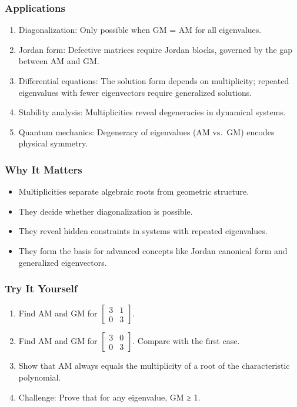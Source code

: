 \documentclass[
  letterpaper,
  DIV=11,
  numbers=noendperiod]{scrreprt}
\providecommand{\tightlist}{%
  \setlength{\itemsep}{0pt}\setlength{\parskip}{0pt}}
\begin{document}
\subsubsection{Applications}\label{applications-25}

\begin{enumerate}
\def\labelenumi{\arabic{enumi}.}
\tightlist
\item
  Diagonalization: Only possible when GM = AM for all eigenvalues.
\item
  Jordan form: Defective matrices require Jordan blocks, governed by the
  gap between AM and GM.
\item
  Differential equations: The solution form depends on multiplicity;
  repeated eigenvalues with fewer eigenvectors require generalized
  solutions.
\item
  Stability analysis: Multiplicities reveal degeneracies in dynamical
  systems.
\item
  Quantum mechanics: Degeneracy of eigenvalues (AM vs.~GM) encodes
  physical symmetry.
\end{enumerate}

\subsubsection{Why It Matters}\label{why-it-matters-59}

\begin{itemize}
\tightlist
\item
  Multiplicities separate algebraic roots from geometric structure.
\item
  They decide whether diagonalization is possible.
\item
  They reveal hidden constraints in systems with repeated eigenvalues.
\item
  They form the basis for advanced concepts like Jordan canonical form
  and generalized eigenvectors.
\end{itemize}

\subsubsection{Try It Yourself}\label{try-it-yourself-62}

\begin{enumerate}
\def\labelenumi{\arabic{enumi}.}
\tightlist
\item
  Find AM and GM for \(\begin{bmatrix} 3 & 1 \\ 0 & 3 \end{bmatrix}\).
\item
  Find AM and GM for \(\begin{bmatrix} 3 & 0 \\ 0 & 3 \end{bmatrix}\).
  Compare with the first case.
\item
  Show that AM always equals the multiplicity of a root of the
  characteristic polynomial.
\item
  Challenge: Prove that for any eigenvalue, GM ≥ 1.
\end{enumerate}
\end{document}
